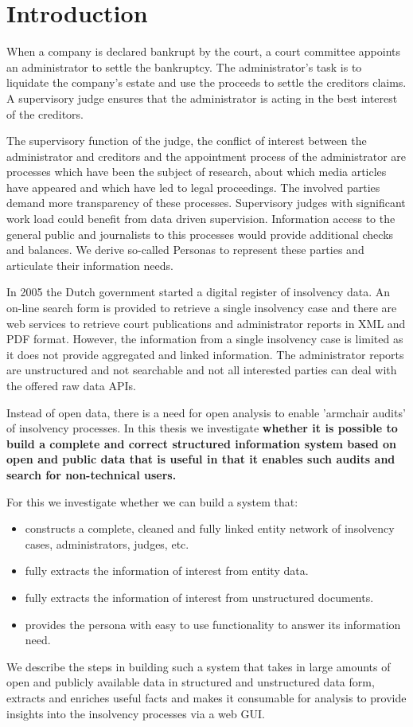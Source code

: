 \section{Introduction}
When a company is declared bankrupt by the court, a court committee appoints an administrator to settle the bankruptcy. The administrator's task is to liquidate the company's estate and use the proceeds to settle the creditors claims. A supervisory judge ensures that the administrator is acting in the best interest of the creditors. 

The supervisory function of the judge, the conflict of interest between the administrator and creditors and the appointment process of the administrator are processes which have been the subject of research\cite{boluk_2011}, about which media articles have appeared \cite{dennis_meneer_2018:1, dennis_meneer_2017:1, jan-hein_strop_2015:1} and which have led to legal proceedings.  The involved parties demand more transparency of these processes. Supervisory judges with significant work load could benefit from data driven supervision. Information access to the general public and journalists to this processes  would provide additional checks and balances. We derive so-called Personas to represent these parties and articulate their information needs.

In 2005 the Dutch government started a digital register of insolvency data\cite{rechtspraak:1}. An on-line search form \cite{rechtspraak:4} is provided to retrieve a single insolvency case and there are web services to retrieve court publications and administrator reports in XML and PDF format. However, the information from a single insolvency case is limited as it does not provide aggregated and linked information. The administrator reports are unstructured and not searchable and not all interested parties can deal with the offered raw data APIs. 

Instead of open data, there is a need for open analysis to enable 'armchair audits'\cite{o_leary_2015} of insolvency processes. In this thesis we investigate \textbf{whether it is possible to build a complete and correct structured information system based on open and public data that is useful in that it enables such audits and search for non-technical users.}

For this we investigate whether we can build a system that:
\begin{itemize}
	\item constructs a complete, cleaned and fully linked entity network of insolvency cases, administrators, judges, etc.
	\item fully extracts the information of interest from entity data.
	\item fully extracts the information of interest from unstructured documents.
	\item provides the persona with easy to use functionality to answer its information need.
\end{itemize}

We describe the steps in building such a system that takes in large amounts of open and publicly available data in structured and unstructured data form, extracts and enriches useful facts and makes it consumable for analysis to provide insights into the insolvency processes via a web GUI.
